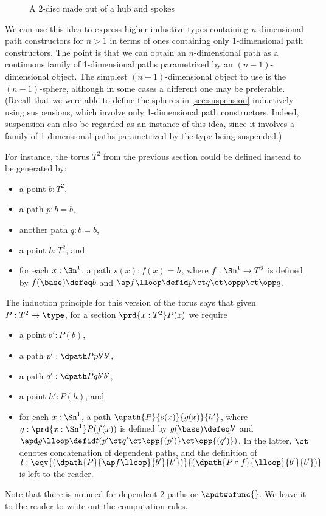 \begin{figure}
  \centering
  \caption{A 2-disc made out of a hub and spokes}
  \label{fig:hub-and-spokes}
\end{figure}

We can use this idea to express higher inductive types containing $n$-dimensional path con\-struc\-tors for $n>1$ in terms of ones containing only 1-di\-men\-sion\-al path con\-struc\-tors.
The point is that we can obtain an $n$-dimensional path as a continuous family of 1-dimensional paths parametrized by an $(n-1)$-di\-men\-sion\-al object.
The simplest $(n-1)$-dimensional object to use is the $(n-1)$-sphere, although in some cases a different one may be preferable.
(Recall that we were able to define the spheres in \cref{sec:suspension} inductively using suspensions, which involve only 1-dimensional path constructors.
Indeed, suspension can also be regarded as an instance of this idea, since it involves a family of 1-dimensional paths parametrized by the type being suspended.)

For instance, the torus $T^2$ from the previous section could be defined instead to be generated by:
\begin{itemize}
\item a point $b:T^2$,
\item a path $p:b=b$,
\item another path $q:b=b$,
\item a point $h:T^2$, and
\item for each $x:\Sn^1$, a path $s(x) : f(x)=h$, where $f:\Sn^1\to T^2$ is defined by $f(\base)\defeq b$ and $\ap f \lloop \defid p \ct q \ct \opp p \ct \opp q$.
\end{itemize}
The induction principle for this version of the torus says that given $P:T^2\to\type$, for a section $\prd{x:T^2} P(x)$ we require
\begin{itemize}
\item a point $b':P(b)$,
\item a path $p' : \dpath P p {b'} {b'}$,
\item a path $q' : \dpath P q {b'} {b'}$,
\item a point $h':P(h)$, and
\item for each $x:\Sn^1$, a path $\dpath {P}{s(x)}{g(x)}{h'}$, where $g:\prd{x:\Sn^1} P(f(x))$ is defined by $g(\base)\defeq b'$ and $\apd g \lloop \defid t(p' \ct q' \ct \opp{(p')} \ct \opp{(q')})$.
  In the latter, $\ct$ denotes concatenation of dependent paths, and the definition of $t:\eqv{(\dpath{P}{\ap f \lloop}{b'}{b'})}{(\dpath{P\circ f}{\lloop}{b'}{b'})}$ is left to the reader.
\end{itemize}
Note that there is no need for dependent 2-paths or $\apdtwofunc{}$.
We leave it to the reader to write out the computation rules.

